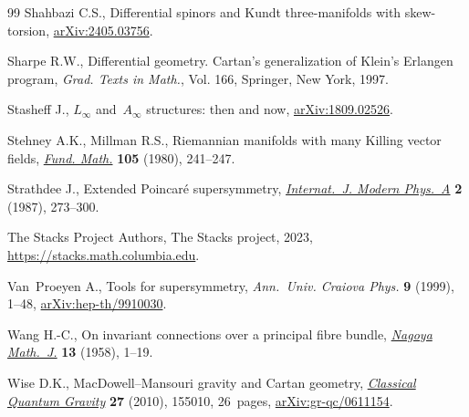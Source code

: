 \documentclass[11pt]{article}
\numberwithin{equation}{section}
\numberwithin{equation}{section}
\newcommand{\1}{\mathbbm{1}}
\begin{document}
\begin{thebibliography}{99}
Shahbazi C.S., Differential spinors and {K}undt three-manifolds with
 skew-torsion, \href{http://arxiv.org/abs/2405.03756}{arXiv:2405.03756}.

Sharpe R.W., Differential geometry. Cartan's generalization of {K}lein's
 {E}rlangen program, \textit{Grad. Texts in Math.}, Vol. 166, Springer, New
 York, 1997.

Stasheff J., $L_\infty$ and~$A_\infty$ structures: then and now,
 \href{http://arxiv.org/abs/1809.02526}{arXiv:1809.02526}.

Stehney A.K., Millman R.S., Riemannian manifolds with many {K}illing vector
 fields, \href{https://doi.org/10.4064/fm-105-3-241-247}{\textit{Fund. Math.}}
 \textbf{105} (1980), 241--247.

Strathdee J., Extended {P}oincar\'e supersymmetry,
 \href{https://doi.org/10.1142/S0217751X87000120}{\textit{Internat.~J. Modern
 Phys.~A}} \textbf{2} (1987), 273--300.

{The Stacks Project Authors}, The Stacks project, 2023, \url{https://stacks.math.columbia.edu}.

Van~Proeyen A., Tools for supersymmetry, \textit{Ann.~Univ. Craiova Phys.}
 \textbf{9} (1999), 1--48,
 \href{http://arxiv.org/abs/hep-th/9910030}{arXiv:hep-th/9910030}.

Wang H.-C., On invariant connections over a principal fibre bundle,
 \href{https://doi.org/10.1017/S0027763000023461}{\textit{Nagoya Math.~J.}}
 \textbf{13} (1958), 1--19.

Wise D.K., Mac{D}owell--{M}ansouri gravity and {C}artan geometry,
 \href{https://doi.org/10.1088/0264-9381/27/15/155010}{\textit{Classical
 Quantum Gravity}} \textbf{27} (2010), 155010, 26~pages,
 \href{http://arxiv.org/abs/gr-qc/0611154}{arXiv:gr-qc/0611154}.

\end{thebibliography}
\end{document}
